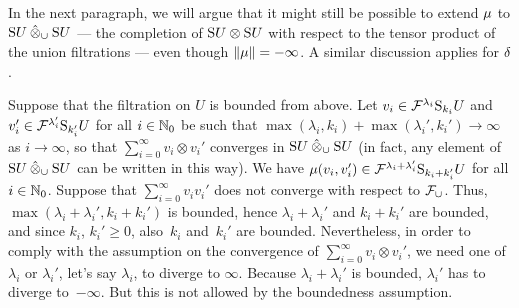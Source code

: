 \documentclass[\MainFolder/Text.tex]{subfiles}
\begin{document}
\begin{Example}
In the next paragraph, we will argue that it might still be possible to extend $\mu$ to $\Sym U\COtimes_\cup\Sym U$ --- the completion of $\mathrm{S} U \otimes\mathrm{S} U$ with respect to the tensor product of the union filtrations --- even though $\| \mu \|=-\infty$. A similar discussion applies for $\delta$.

Suppose that the filtration on $U$ is bounded from above. Let $v_i\in\mathcal{F}^{\lambda_i}\mathrm{S}_{k_i}U$ and $v_i'\in \mathcal{F}^{\lambda_i'}\mathrm{S}_{k_i'}U$ for all $i\in \mathbb{N}_0$ be such that $\max(\lambda_i,k_i) + \max(\lambda_i',k_i') \to \infty$ as $i\to \infty$, so that $\sum_{i=0}^\infty v_i \otimes v_i'$ converges in $\Sym U\COtimes_\cup\Sym U$ (in fact, any element of $\Sym U\COtimes_\cup \Sym U$ can be written in this way). We have $\mu(v_i,v_i') \in\mathcal{F}^{\lambda_i + \lambda_i'}\mathrm{S}_{k_i+k_i'}U$ for all $i\in \mathbb{N}_0$. Suppose that $\sum_{i=0}^\infty v_i v_i'$ does not converge with respect to $\mathcal{F}_\cup$. Thus, $\max(\lambda_i + \lambda_i',k_i+k_i')$ is bounded, hence $\lambda_i + \lambda_i'$ and $k_i + k_i'$ are bounded, and since $k_i$, $k_i'\ge 0$, also~$k_i$ and~$k_i'$ are bounded. Nevertheless, in order to comply with the assumption on the convergence of $\sum_{i=0}^\infty v_i \otimes v_i'$, we need one of $\lambda_i$ or $\lambda_i'$, let's say $\lambda_i$, to diverge to $\infty$. Because $\lambda_i + \lambda_i'$ is bounded, $\lambda_i'$ has to diverge to~$-\infty$. But this is not allowed by the boundedness assumption.
\end{Example}
\end{document}
